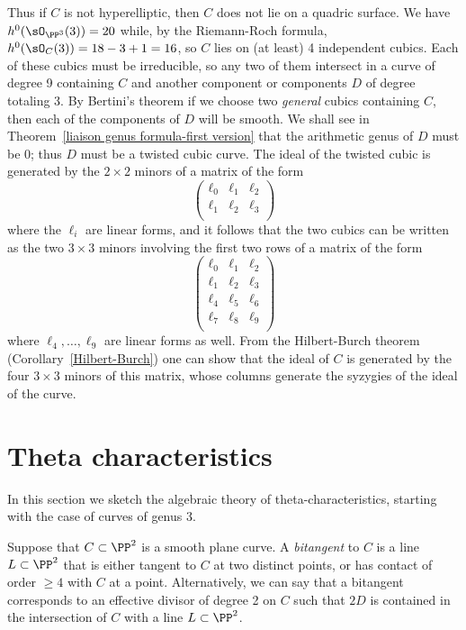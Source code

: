 Thus if $C$ is not hyperelliptic, then $C$ does not lie on a quadric surface. We have $h^0(\sO_{\PP^3}(3)) = 20$ while, by the Riemann-Roch formula, $h^0(\sO_C(3)) = 18-3+1= 16$, so $C$ lies on (at least) 4 independent cubics. Each of these cubics must be irreducible, so any two of them
intersect in a curve of degree 9 containing $C$ and another component or components $D$ of degree totaling 3. By Bertini's theorem
if we choose two \emph{general} cubics containing $C$, then each of the components of $D$ will be smooth. We shall see in Theorem~\ref{liaison genus formula-first version} that the arithmetic genus of $D$ must be 0; thus $D$ must be a twisted cubic curve. The ideal of the twisted cubic is generated by the $2\times 2$ minors of a matrix of the form
$$
\begin{pmatrix}
 \ell_0& \ell_1&\ell_2\\
 \ell_1& \ell_2&\ell_3\\
\end{pmatrix}
$$
where the $\ell_i$ are linear forms,
and it follows that the two cubics can be written as the two $3\times 3$ minors involving the first two rows of  a matrix of the form
$$
\begin{pmatrix}\label{hilbert-burch matrix}
 \ell_0& \ell_1&\ell_2\\
 \ell_1& \ell_2&\ell_3\\
\ell_4& \ell_5&\ell_6\\
 \ell_7& \ell_8&\ell_9\\
\end{pmatrix}
$$
where $\ell_4,\dots,\ell_9$ are linear forms as well.
From the Hilbert-Burch theorem (Corollary~\ref{Hilbert-Burch}) one can show that the ideal of $C$ is generated by the four $3\times 3$ minors of this matrix, whose columns generate
the syzygies of the ideal of the curve.


\section{Theta characteristics}

In this section we sketch the algebraic theory of theta-characteristics, starting with the case of curves of genus 3.

Suppose that $C \subset \PP^2$ is a smooth plane curve. A \emph{bitangent} to $C$ is a line $L \subset \PP^2$ that is either tangent to $C$ at two distinct points, or has contact of order $\geq 4$ with $C$ at a point. Alternatively, we can say that a bitangent  corresponds to an effective divisor of degree 2 on $C$ such that $2D$ is contained in the intersection of $C$ with a line $L \subset \PP^2$.

